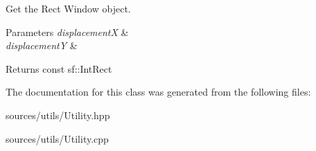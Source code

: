 Get the Rect Window object. 


\begin{DoxyParams}{Parameters}
{\em displacementX} & \\
\hline
{\em displacementY} & \\
\hline
\end{DoxyParams}
\begin{DoxyReturn}{Returns}
const sf\+::\+Int\+Rect 
\end{DoxyReturn}


The documentation for this class was generated from the following files\+:\begin{DoxyCompactItemize}
\item 
sources/utils/Utility.\+hpp\item 
sources/utils/Utility.\+cpp\end{DoxyCompactItemize}

